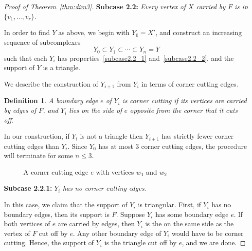 \documentclass[10pt]{amsart}
\newtheorem{defi}[theorem]{Definition}
\newenvironment{proofsection}[2]{\par\smallskip\noindent\textbf{#1} \emph{#2}.\par\nobreak}{\par\smallskip}
\begin{document}
\begin{proof}[Proof of Theorem~\ref{thm:dim3}]
\begin{proofsection}{Subcase 2.2:}{Every vertex of $X$ carried by $F$ is in $\{v_1, \ldots, v_r\}$}
In order to find $Y$ as above, we begin with $Y_0=X'$, and construct an increasing sequence of subcomplexes
\[
Y_0 \subset Y_1 \subset \cdots \subset Y_n = Y
\] 
such that each $Y_i$ has properties~\eqref{subcase2.2_1} and~\eqref{subcase2.2_2}, and the support of $Y$ is a triangle.

We describe the construction of $Y_{i+1}$ from $Y_{i}$ in terms of corner cutting edges.
\end{proofsection}

\begin{defi}
A boundary edge $e$ of $Y_i$ is \emph{corner cutting} if its vertices are carried by edges of $F$, and $Y_i$ lies on the side of $e$ opposite from the corner that it cuts off.
\end{defi}

In our construction, if $Y_i$ is not a triangle then $Y_{i+1}$ has strictly fewer corner cutting edges than $Y_i$. Since $Y_0$ has at most $3$ corner cutting edges, the procedure will terminate for some $n \leq 3$.

\begin{figure}[htb]\centering
\vspace*{-2mm}



\vspace*{-2mm}
\caption{A corner cutting edge $e$ with vertices $w_1$ and $w_2$}
\label{fig:ccedge}

\vspace*{-2mm}
\end{figure}


\begin{proofsection}{Subcase 2.2.1:}{$Y_i$ has no corner cutting edges} 

In this case, we claim that the support of $Y_i$ is triangular. First, if $Y_i$ has no boundary edges, then its support is $F$. Suppose $Y_i$ has some boundary edge $e$. If both vertices of $e$ are carried by edges, then $Y_i$ is the on the same side as the vertex of $F$ cut off by $e$. Any other boundary edge of $Y_i$ would have to be corner cutting. Hence, the support of $Y_i$ is the triangle cut off by $e$, and we are done.


\end{proofsection}
\end{proof}
\end{document}
